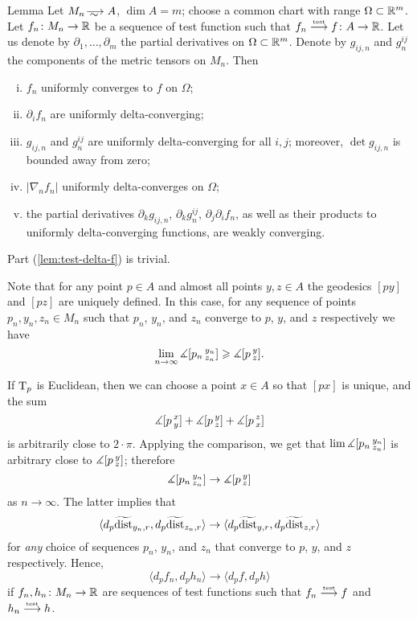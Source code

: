 \begin{thm}{Lemma}\label{lem:test-delta}
Let $M_n\smooths{} A$, $\dim A=m$;
choose a common chart with range $\Omega\subset \mathbb{R}^m$.
Let $f_n\colon M_n\to\mathbb{R}$ be a sequence of test function such that $f_n\zz\testto f\:A\to \RR$.
Let us denote by $\partial_1,\dots,\partial_m$ the partial derivatives on $\Omega\subset \mathbb{R}^m$.
Denote by $g_{ij,n}$ and $g^{ij}_n$ the components of the metric tensors on $M_n$.
Then 
\begin{enumerate}[(i)]
\item\label{lem:test-delta-f} $f_n$ uniformly converges to $f$ on $\Omega$;
\item\label{lem:test-delta-partial} $\partial_if_n$ are uniformly delta-converging;
\item\label{lem:test-delta-g}  $g_{ij,n}$ and $g^{ij}_n$ are uniformly delta-converging for all $i,j$;
moreover, $\det g_{ij,n}$ is bounded away from zero;
\item\label{lem:test-delta|nabla|} $|\nabla_n f_n|$ uniformly delta-converges on $\Omega$; %
\item\label{lem:test-delta-partial-g} the partial derivatives $\partial_kg_{ij,n}$, $\partial_k g^{ij}_n$,  $\partial_j\partial_if_n$, as well as their products to uniformly delta-converging functions,  are weakly converging.
\end{enumerate}

\end{thm}

 Part (\ref{lem:test-delta-f}) is trivial.

Note that for any point $p\in A$ and almost all points $y,z\in A$ the geodesics $[py]$ and $[pz]$ are uniquely defined.
In this case, for any sequence of points $p_n,y_n,z_n\in M_n$ such that $p_n$, $y_n$, and $z_n$ converge to $p$, $y$, and $z$ respectively we have
\[\lim_{n\to\infty}\measuredangle [p_n\,{}^{y_n}_{z_n}]\geqslant \measuredangle [p\,{}^{y}_{z}].\]

If $\mathrm{T}_p$ is Euclidean, then we can choose a point $x\in A$ so that $[px]$ is unique, and the sum 
\[\measuredangle [p\,{}^{x}_{y}]+\measuredangle [p\,{}^{y}_{z}]+\measuredangle [p\,{}^{z}_{x}]\]
is arbitrarily close to $2\cdot\pi$.
Applying the comparison, we get that $\lim\measuredangle [p_n\,{}^{y_n}_{z_n}]$ is arbitrary close to $\measuredangle [p\,{}^{y}_{z}]$; therefore
\[\measuredangle [p_n\,{}^{y_n}_{z_n}]\to\measuredangle [p\,{}^{y}_{z}]\]
as $n\to\infty$.
The latter implies that
\[\langle d_p\widetilde{\operatorname{\rm dist}}_{y_n,r},d_p\widetilde{\operatorname{\rm dist}}_{z_n,r}\rangle\to \langle d_p\widetilde{\operatorname{\rm dist}}_{y,r},d_p\widetilde{\operatorname{\rm dist}}_{z,r}\rangle\]
for \emph{any} choice of sequences $p_n$, $y_n$, and $z_n$ that converge to $p$, $y$, and $z$ respectively.
Hence,
\[\langle d_pf_n,d_ph_n\rangle\to \langle d_pf,d_ph\rangle\]
if $f_n,h_n\colon M_n\to\mathbb{R}$ are sequences of test functions such that $f_n\stackrel{\text{\tiny\rm test}}{\longrightarrow} f$ and $h_n\stackrel{\text{\tiny\rm test}}{\longrightarrow} h$.

